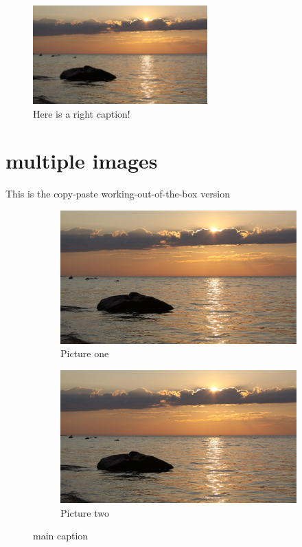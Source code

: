 \documentclass[12pt]{report}
\begin{document}
\begin{figure} %
\caption{Here is a right caption!}
\includegraphics[width=0.6\textwidth]{demo}
\end{figure}

\section{multiple images}
This is the copy-paste working-out-of-the-box version 
\begin{figure}[h!]
\centering
    \begin{subfigure}[t]{0.35\textwidth}
        \centering
        \includegraphics[width=\textwidth]{demo}
        \caption{Picture one}
        \label{fig:one}
    \end{subfigure}
    \begin{subfigure}[t]{0.35\textwidth}
        \centering
        \includegraphics[width=\textwidth]{demo}
        \caption{Picture two}
        \label{fig:two}
    \end{subfigure}
\caption{main caption}
\label{fig:main}
\end{figure}
\end{document}
